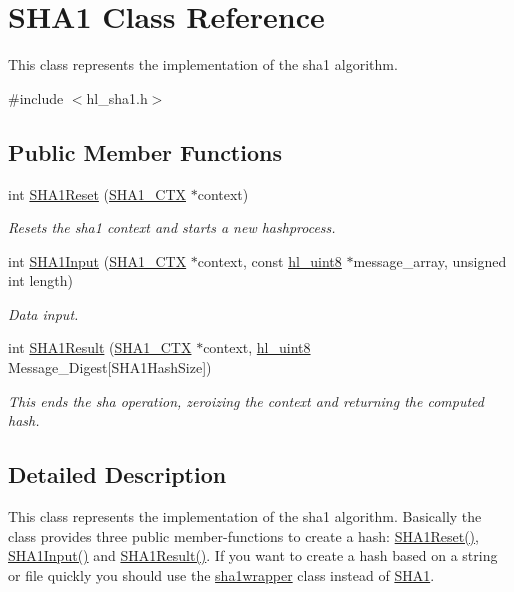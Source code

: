 \hypertarget{class_s_h_a1}{
\section{SHA1 Class Reference}
\label{class_s_h_a1}
}


This class represents the implementation of the sha1 algorithm.  


{\ttfamily \#include $<$hl\_\-sha1.h$>$}\subsection*{Public Member Functions}
\begin{DoxyCompactItemize}
\item 
int \hyperlink{class_s_h_a1_a03a92bcc340163fc0cff4050fa51619f}{SHA1Reset} (\hyperlink{struct_s_h_a1___c_t_x}{SHA1\_\-CTX} $\ast$context)
\begin{DoxyCompactList}\small\item\em Resets the sha1 context and starts a new hashprocess. \item\end{DoxyCompactList}\item 
int \hyperlink{class_s_h_a1_ab4e33d976b42b7b9df3fa31f17a374ad}{SHA1Input} (\hyperlink{struct_s_h_a1___c_t_x}{SHA1\_\-CTX} $\ast$context, const \hyperlink{hl__types_8h_adc1917ae5f0dc40725be12536ffe0a6c}{hl\_\-uint8} $\ast$message\_\-array, unsigned int length)
\begin{DoxyCompactList}\small\item\em Data input. \item\end{DoxyCompactList}\item 
int \hyperlink{class_s_h_a1_a0d036511ed4730fc4b575b57efc8cacf}{SHA1Result} (\hyperlink{struct_s_h_a1___c_t_x}{SHA1\_\-CTX} $\ast$context, \hyperlink{hl__types_8h_adc1917ae5f0dc40725be12536ffe0a6c}{hl\_\-uint8} Message\_\-Digest\mbox{[}SHA1HashSize\mbox{]})
\begin{DoxyCompactList}\small\item\em This ends the sha operation, zeroizing the context and returning the computed hash. \item\end{DoxyCompactList}\end{DoxyCompactItemize}


\subsection{Detailed Description}
This class represents the implementation of the sha1 algorithm. Basically the class provides three public member-\/functions to create a hash: \hyperlink{class_s_h_a1_a03a92bcc340163fc0cff4050fa51619f}{SHA1Reset()}, \hyperlink{class_s_h_a1_ab4e33d976b42b7b9df3fa31f17a374ad}{SHA1Input()} and \hyperlink{class_s_h_a1_a0d036511ed4730fc4b575b57efc8cacf}{SHA1Result()}. If you want to create a hash based on a string or file quickly you should use the \hyperlink{classsha1wrapper}{sha1wrapper} class instead of \hyperlink{class_s_h_a1}{SHA1}. 

